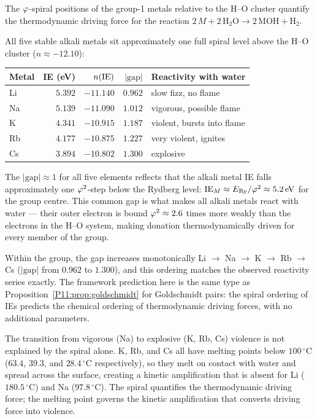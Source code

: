 \begin{remark}
\label{P11:rem:alkali_reactivity}
The $\varphi$-spiral positions of the group-1 metals relative to the H--O
cluster quantify the thermodynamic driving force for the reaction
$2\,M + 2\,\mathrm{H_2O} \to 2\,\mathrm{MOH} + \mathrm{H_2}$.

All five stable alkali metals sit approximately one full spiral level
above the H--O cluster ($n \approx -12.10$):
\begin{center}
\begin{tabular}{lrrrl}
\toprule
Metal & IE (eV) & $n(\mathrm{IE})$ & $|\text{gap}|$ & Reactivity with water \\
\midrule
Li & $5.392$ & $-11.140$ & $0.962$ & slow fizz, no flame \\
Na & $5.139$ & $-11.090$ & $1.012$ & vigorous, possible flame \\
K  & $4.341$ & $-10.915$ & $1.187$ & violent, bursts into flame \\
Rb & $4.177$ & $-10.875$ & $1.227$ & very violent, ignites \\
Cs & $3.894$ & $-10.802$ & $1.300$ & explosive \\
\bottomrule
\end{tabular}
\end{center}
The $|\text{gap}| \approx 1$ for all five elements reflects that the
alkali metal IE falls approximately one $\varphi^2$-step below the
Rydberg level: $\mathrm{IE}_M \approx E_{\mathrm{Ry}}/\varphi^2 \approx 5.2\,\mathrm{eV}$
for the group centre.
This common gap is what makes all alkali metals react with water ---
their outer electron is bound $\varphi^2 \approx 2.6$ times more weakly
than the electrons in the H--O system, making donation thermodynamically
driven for every member of the group.

Within the group, the gap increases monotonically
Li $\to$ Na $\to$ K $\to$ Rb $\to$ Cs ($|\text{gap}|$ from
$0.962$ to $1.300$), and this ordering matches the observed reactivity
series exactly.
The framework prediction here is the same type as
Proposition~\ref{P11:prop:goldschmidt} for Goldschmidt pairs:
the spiral ordering of IEs predicts the chemical ordering of
thermodynamic driving forces, with no additional parameters.

The transition from vigorous (Na) to explosive (K, Rb, Cs) violence
is not explained by the spiral alone.
K, Rb, and Cs all have melting points below $100\,^{\circ}\mathrm{C}$
($63.4$, $39.3$, and $28.4\,^{\circ}\mathrm{C}$ respectively),
so they melt on contact with water and spread across the surface,
creating a kinetic amplification that is absent for Li
($180.5\,^{\circ}\mathrm{C}$) and Na ($97.8\,^{\circ}\mathrm{C}$).
The spiral quantifies the thermodynamic driving force; the melting
point governs the kinetic amplification that converts driving force
into violence.
\end{remark}

